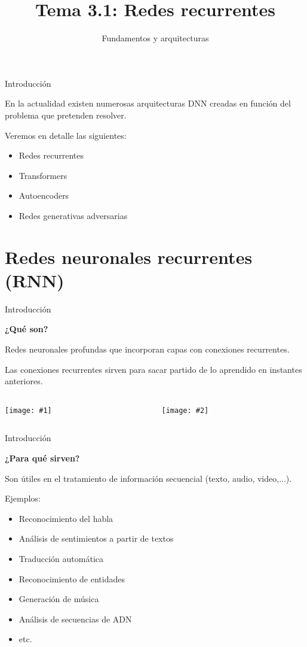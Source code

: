 \documentclass[aspectratio=169]{beamer}
\title{Tema 3.1: Redes recurrentes}
\subtitle{Fundamentos y arquitecturas}
\newenvironment{blockm}[1]{%
  \begin{block}{\textbf{#1}}%
  }{%
  \end{block}%
  \vspace{1em}%
}
\newcommand{\twoimages}[3]{%
  \begin{columns}
    \begin{column}{0.5\textwidth}
      \centering
      \texttt{[image: \#1]}
    \end{column}
    \begin{column}{0.5\textwidth}
      \centering
      \texttt{[image: \#2]}
    \end{column}
  \end{columns}
}
\begin{document}
\begin{frame}[plain]
	\titlepage 
\end{frame}

\logo{}

\begin{frame}{Introducción}
  
  \begin{blockm}{}
    En la actualidad existen numerosas arquitecturas DNN creadas en función del problema que pretenden resolver.\\
  \end{blockm}
  Veremos en detalle las siguientes:
  \begin{itemize}
    \item Redes recurrentes
    \item Transformers
    \item Autoencoders
	\item Redes generativas adversarias
  \end{itemize}
\end{frame}

\section{Redes neuronales recurrentes (RNN)}

\begin{frame}{Introducción}
  \begin{blockm}{¿Qué son?}
    Redes neuronales profundas que incorporan capas con conexiones recurrentes.
  \end{blockm}
  Las conexiones recurrentes sirven para sacar partido de lo aprendido en instantes anteriores.
  \vspace{1em}
  \twoimages{imgs/tema4/rnn/DNN.pdf}{imgs/tema4/rnn/RNN.pdf}{0.55}
\end{frame}

\begin{frame}{Introducción}
  \begin{blockm}{¿Para qué sirven?}
    Son útiles en el tratamiento de información secuencial (texto, audio, video,...).
  \end{blockm}
  Ejemplos:
  \begin{itemize}
    \item Reconocimiento del habla
    \item Análisis de sentimientos a partir de textos
    \item Traducción automática
    \item Reconocimiento de entidades
    \item Generación de música
    \item Análisis de secuencias de ADN
    \item etc.
  \end{itemize}

\end{frame}
\end{document}
